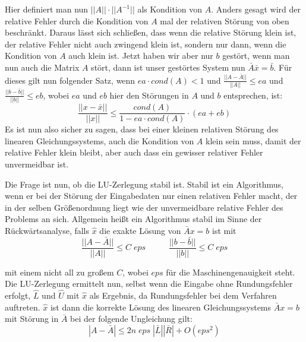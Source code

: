 \documentclass[course=erap]{aspdoc}
\begin{document}
Hier definiert man nun $||A|| \cdot ||A^{-1}||$ als Kondition von $A$. Anders gesagt wird 
der relative Fehler durch die Kondition von $A$ mal der relativen Störung 
von oben beschränkt. Daraus lässt sich schließen, dass wenn die relative Störung klein 
ist, der relative Fehler nicht auch zwingend klein ist, sondern nur dann, wenn die 
Kondition von $A$ auch klein ist.
Jetzt haben wir aber nur $b$ gestört, wenn man nun auch die Matrix $A$ stört, dann ist 
unser gestörtes System nun $\bar{A} \bar{x} = \bar{b}$. Für dieses gilt nun folgender Satz, 
wenn $ea \cdot cond(A) < 1$ und $\frac{||A - \bar{A}||} {||A||} \leq ea $	und 	$\frac{||b - \bar{b}||} {||b||} \leq eb $, wobei 
$ea$ und $eb$ hier den Störungen in $A$ und $b$ entsprechen, ist:\\
  \begin{equation}
    \frac{||x-\bar{x}||} {||x||} \leq \frac{cond(A)} {1- ea \cdot cond(A)} \cdot (ea + eb)   
  \end{equation}
Es ist nun also sicher zu sagen, dass bei einer kleinen relativen Störung des linearen 
Gleichungssystems, auch die Kondition von $A$ klein sein muss, damit der relative Fehler 
klein bleibt, aber auch dass ein gewisser relativer Fehler unvermeidbar ist.

Die Frage ist nun, ob die LU-Zerlegung stabil ist.
Stabil ist ein Algorithmus, wenn er bei der Störung der Eingabedaten nur einen relativen Fehler macht, 
der in der selben Größenordnung liegt wie der unvermeidbare relative Fehler des Problems an sich. 
Allgemein heißt ein Algorithmus stabil im Sinne der Rückwärtsanalyse, 
falls $\hat{x}$ die exakte Lösung von $\bar{A}x = b$ ist mit 	
  \begin{equation}
    \label{norm}
    \frac{|| A - \bar{A}||}{||A||} \leq C \; eps \;\; \;\;\;\;\;\;\;\;  \frac{|| b - \bar{b}||}{||b||} \leq C \; eps
  \end{equation}

mit einem nicht all zu großem $C$, wobei $eps$ für die Maschinengenauigkeit steht.
Die LU-Zerlegung ermittelt nun, selbst wenn die Eingabe ohne Rundungsfehler erfolgt, $\hat{L}$ und $\hat{U}$ mit 
$\hat{x}$ als Ergebnis, da Rundungsfehler bei dem Verfahren auftreten. $\hat{x}$ ist dann die 
korrekte Lösung des linearen Gleichungssystems $\bar{A}x=b$ mit Störung in $\bar{A}$ bei der folgende Ungleichung gilt:
  \begin{equation}
    \label{eg3}
    |A - \bar{A}| \leq 2n \; eps \; |\bar{L}||\bar{R}| + O(eps^2)
  \end{equation}
\end{document}
